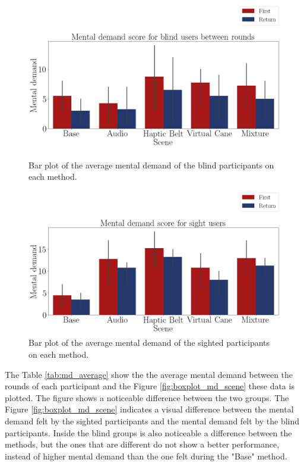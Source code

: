 \begin{figure}[!htb]
    \centering
    \begin{minipage}{\textwidth}
        \centering
        \includegraphics[width = 0.8\linewidth]{Resultados/Nasa/Figuras/png/barplot_md_avg_scene_blind.png}
        \caption{Bar plot of the average mental demand of the blind participants on each method.}
        \label{fig:barplot_md_scene_blind}
    \end{minipage}
    \begin{minipage}{\textwidth}
        \centering
        \includegraphics[width = 0.8\linewidth]{Resultados/Nasa/Figuras/png/barplot_md_avg_scene_sight.png}
        \caption{Bar plot of the average mental demand of the sighted participants on each method.}
        \label{fig:barplot_md_scene_sight}
    \end{minipage}
\end{figure}


The Table \ref{tab:md_average} show the the average mental demand between the rounds of each participant and the Figure \ref{fig:boxplot_md_scene} these data is plotted. The figure shows a noticeable difference between the two groups.  The Figure \ref{fig:boxplot_md_scene} indicates a visual difference between the mental demand felt by the sighted participants and the mental demand felt by the blind participants. Inside the blind groups is also noticeable a difference between the methods, but the ones that are different do not show a better performance, instead of higher mental demand than the one felt during the "Base" method.

